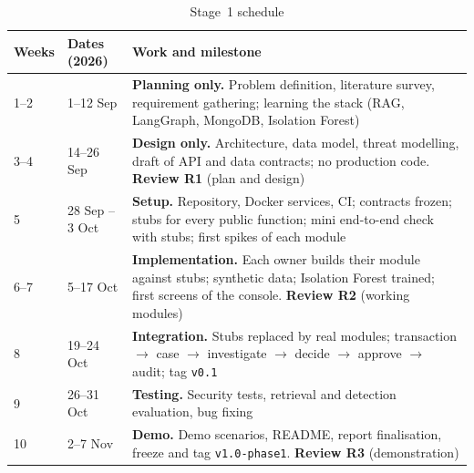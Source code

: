 \documentclass[oneside,a4paper,12pt]{report}
\begin{document}
\begin{table}[H]
\centering\small
\begin{tabularx}{\textwidth}{|l|l|X|}
\hline
\textbf{Weeks} & \textbf{Dates (2026)} & \textbf{Work and milestone} \\ \hline
1--2 & 1--12 Sep & \textbf{Planning only.} Problem definition, literature survey, requirement gathering; learning the stack (RAG, LangGraph, MongoDB, Isolation Forest) \\ \hline
3--4 & 14--26 Sep & \textbf{Design only.} Architecture, data model, threat modelling, draft of API and data contracts; no production code. \textbf{Review R1} (plan and design) \\ \hline
5 & 28 Sep -- 3 Oct & \textbf{Setup.} Repository, Docker services, CI; contracts frozen; stubs for every public function; mini end-to-end check with stubs; first spikes of each module \\ \hline
6--7 & 5--17 Oct & \textbf{Implementation.} Each owner builds their module against stubs; synthetic data; Isolation Forest trained; first screens of the console. \textbf{Review R2} (working modules) \\ \hline
8 & 19--24 Oct & \textbf{Integration.} Stubs replaced by real modules; transaction $\rightarrow$ case $\rightarrow$ investigate $\rightarrow$ decide $\rightarrow$ approve $\rightarrow$ audit; tag \texttt{v0.1} \\ \hline
9 & 26--31 Oct & \textbf{Testing.} Security tests, retrieval and detection evaluation, bug fixing \\ \hline
10 & 2--7 Nov & \textbf{Demo.} Demo scenarios, README, report finalisation, freeze and tag \texttt{v1.0-phase1}. \textbf{Review R3} (demonstration) \\ \hline
\end{tabularx}
\caption{Stage~1 schedule}
\end{table}
\end{document}
